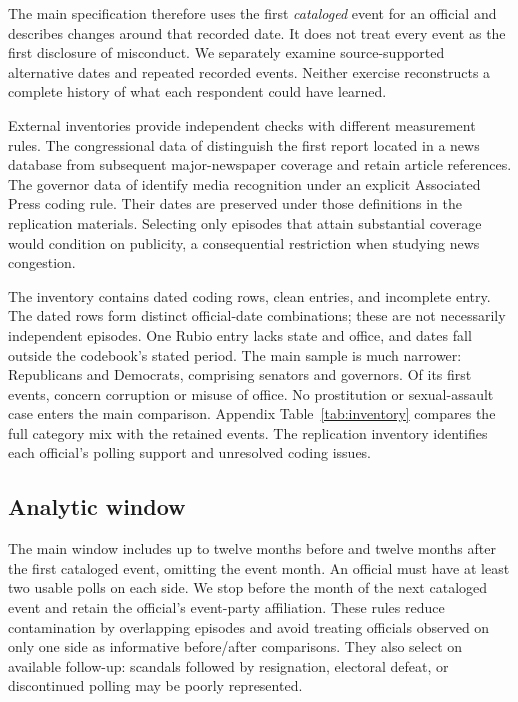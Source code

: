 \documentclass[11pt]{article}
\begin{document}
The main specification therefore uses the first \emph{cataloged} event for an official and describes changes around that recorded date. It does not treat every event as the first disclosure of misconduct. We separately examine source-supported alternative dates and repeated recorded events. Neither exercise reconstructs a complete history of what each respondent could have learned.

External inventories provide independent checks with different measurement rules. The congressional data of \citet{preuss2024} distinguish the first report located in a news database from subsequent major-newspaper coverage and retain article references. The governor data of \citet{nyhan2017} identify media recognition under an explicit Associated Press coding rule. Their dates are preserved under those definitions in the replication materials. Selecting only episodes that attain substantial coverage would condition on publicity, a consequential restriction when studying news congestion.

The inventory contains \InventoryDatedRows{} dated coding rows, \InventoryCleanRows{} clean entries, and \InventoryIncompleteRows{} incomplete entry. The dated rows form \InventoryDistinctDates{} distinct official-date combinations; these are not necessarily independent episodes. One Rubio entry lacks state and office, and \InventoryOutsidePeriod{} dates fall outside the codebook's stated period. The main sample is much narrower: \InventoryRepublican{} Republicans and \InventoryDemocrat{} Democrats, comprising \InventorySenators{} senators and \InventoryGovernors{} governors. Of its \InventoryMainEvents{} first events, \InventoryCorruption{} concern corruption or misuse of office. No prostitution or sexual-assault case enters the main comparison. Appendix Table~\ref{tab:inventory} compares the full category mix with the retained events. The replication inventory identifies each official's polling support and unresolved coding issues.

\subsection{Analytic window}

The main window includes up to twelve months before and twelve months after the first cataloged event, omitting the event month. An official must have at least two usable polls on each side. We stop before the month of the next cataloged event and retain the official's event-party affiliation. These rules reduce contamination by overlapping episodes and avoid treating officials observed on only one side as informative before/after comparisons. They also select on available follow-up: scandals followed by resignation, electoral defeat, or discontinued polling may be poorly represented.
\end{document}
